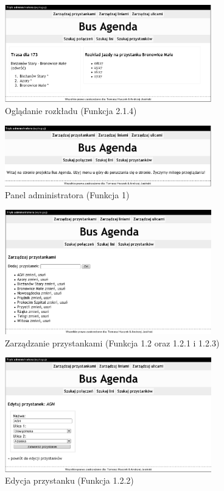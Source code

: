 \begin{figure}[!htp]
    \centering
    \includegraphics[width=0.8\textwidth]{./img/screens/showTT.eps}
    \caption{Oglądanie rozkładu (Funkcja 2.1.4)}
    \label{fig:showTT}
\end{figure}

\begin{figure}[!htp]
    \centering
    \includegraphics[width=0.8\textwidth]{./img/screens/adminMain.eps}
    \caption{Panel administratora (Funkcja 1)}
    \label{fig:adminMain}
\end{figure}
%
\begin{figure}[!htp]
    \centering
    \includegraphics[width=0.8\textwidth]{./img/screens/manageBS_main.eps}
    \caption{Zarządzanie przystankami (Funkcja 1.2 oraz 1.2.1 i 1.2.3)}
    \label{fig:adminMain}
\end{figure}
\begin{figure}[!htp]
    \centering
    \includegraphics[width=0.8\textwidth]{./img/screens/manageBS.eps}
    \caption{Edycja przystanku (Funkcja 1.2.2)}
    \label{fig:adminMain}
\end{figure}
